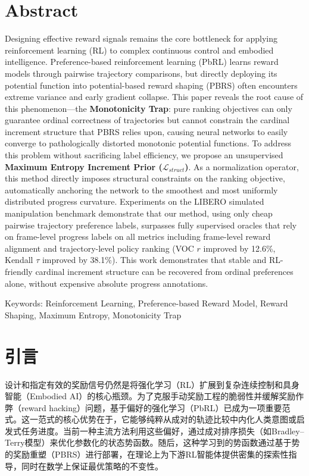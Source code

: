 \section*{Abstract}
Designing effective reward signals remains the core bottleneck for applying reinforcement learning (RL) to complex continuous control and embodied intelligence. Preference-based reinforcement learning (PbRL) learns reward models through pairwise trajectory comparisons, but directly deploying its potential function into potential-based reward shaping (PBRS) often encounters extreme variance and early gradient collapse. This paper reveals the root cause of this phenomenon---the \textbf{Monotonicity Trap}: pure ranking objectives can only guarantee ordinal correctness of trajectories but cannot constrain the cardinal increment structure that PBRS relies upon, causing neural networks to easily converge to pathologically distorted monotonic potential functions. To address this problem without sacrificing label efficiency, we propose an unsupervised \textbf{Maximum Entropy Increment Prior ($\mathcal{L}_{struct}$)}. As a normalization operator, this method directly imposes structural constraints on the ranking objective, automatically anchoring the network to the smoothest and most uniformly distributed progress curvature. Experiments on the LIBERO simulated manipulation benchmark demonstrate that our method, using only cheap pairwise trajectory preference labels, surpasses fully supervised oracles that rely on frame-level progress labels on all metrics including frame-level reward alignment and trajectory-level policy ranking (VOC $r$ improved by 12.6\%, Kendall $\tau$ improved by 38.1\%). This work demonstrates that stable and RL-friendly cardinal increment structure can be recovered from ordinal preferences alone, without expensive absolute progress annotations.

\vspace{1em}\noindent
{\hei Keywords:}
{\songti \rmfamily Reinforcement Learning, Preference-based Reward Model, Reward Shaping, Maximum Entropy, Monotonicity Trap}

\clearpage



\setcounter{page}{1}
\section{引言}

设计和指定有效的奖励信号仍然是将强化学习（RL）扩展到复杂连续控制和具身智能（Embodied AI）的核心瓶颈。为了克服手动奖励工程的脆弱性并缓解奖励作弊（reward hacking）问题，基于偏好的强化学习（PbRL）已成为一项重要范式\cite{christiano2017,lee2021}。这一范式的核心优势在于，它能够纯粹从成对的轨迹比较中内化人类意图或启发式任务进度。当前一种主流方法利用这些偏好，通过成对排序损失（如Bradley--Terry模型\cite{bradley1952}）来优化参数化的状态势函数\cite{brown2019,krack2026}。随后，这种学习到的势函数通过基于势的奖励重塑（PBRS）\cite{ng1999}进行部署，在理论上为下游RL智能体提供密集的探索性指导，同时在数学上保证最优策略的不变性。

